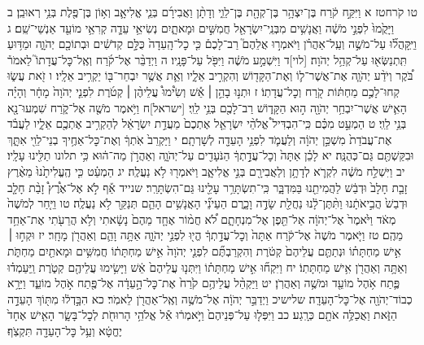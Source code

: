 \documentclass[twoside, openany, parskip=half, 11pt]{book}
\begin{document}
טו קֹרחטז א וַיִּקַּ֣ח קֹ֔רַח בֶּן־יִצְהָ֥ר בֶּן־קְהָ֖ת בֶּן־לֵוִ֑י וְדָתָ֨ן וַאֲבִירָ֜ם בְּנֵ֧י אֱלִיאָ֛ב וְא֥וֹן בֶּן־פֶּ֖לֶת בְּנֵ֥י רְאוּבֵֽן׃ ב וַיָּקֻ֙מוּ֙ לִפְנֵ֣י מֹשֶׁ֔ה וַאֲנָשִׁ֥ים מִבְּנֵֽי־יִשְׂרָאֵ֖ל חֲמִשִּׁ֣ים וּמָאתָ֑יִם נְשִׂיאֵ֥י עֵדָ֛ה קְרִאֵ֥י מוֹעֵ֖ד אַנְשֵׁי־שֵֽׁם׃ ג וַיִּֽקָּהֲל֞וּ עַל־מֹשֶׁ֣ה וְעַֽל־אַהֲרֹ֗ן וַיֹּאמְר֣וּ אֲלֵהֶם֮ רַב־לָכֶם֒ כִּ֤י כׇל־הָֽעֵדָה֙ כֻּלָּ֣ם קְדֹשִׁ֔ים וּבְתוֹכָ֖ם יְהֹוָ֑ה וּמַדּ֥וּעַ תִּֽתְנַשְּׂא֖וּ עַל־קְהַ֥ל יְהֹוָה׃ [לוי]ד וַיִּשְׁמַ֣ע מֹשֶׁ֔ה וַיִּפֹּ֖ל עַל־פָּנָֽיו׃ ה וַיְדַבֵּ֨ר אֶל־קֹ֜רַח וְאֶֽל־כׇּל־עֲדָתוֹ֮ לֵאמֹר֒ בֹּ֠קֶר וְיֹדַ֨ע יְהֹוָ֧ה אֶת־אֲשֶׁר־ל֛וֹ וְאֶת־הַקָּד֖וֹשׁ וְהִקְרִ֣יב אֵלָ֑יו וְאֵ֛ת אֲשֶׁ֥ר יִבְחַר־בּ֖וֹ יַקְרִ֥יב אֵלָֽיו׃ ו זֹ֖את עֲשׂ֑וּ קְחוּ־לָכֶ֣ם מַחְתּ֔וֹת קֹ֖רַח וְכׇל־עֲדָתֽוֹ׃ ז וּתְנ֣וּ בָהֵ֣ן ׀ אֵ֡שׁ וְשִׂ֩ימוּ֩ עֲלֵיהֶ֨ן ׀ קְטֹ֜רֶת לִפְנֵ֤י יְהֹוָה֙ מָחָ֔ר וְהָיָ֗ה הָאִ֛ישׁ אֲשֶׁר־יִבְחַ֥ר יְהֹוָ֖ה ה֣וּא הַקָּד֑וֹשׁ רַב־לָכֶ֖ם בְּנֵ֥י לֵוִֽי׃ [ישראל]ח וַיֹּ֥אמֶר מֹשֶׁ֖ה אֶל־קֹ֑רַח שִׁמְעוּ־נָ֖א בְּנֵ֥י לֵוִֽי׃ ט הַמְעַ֣ט מִכֶּ֗ם כִּֽי־הִבְדִּיל֩ אֱלֹהֵ֨י יִשְׂרָאֵ֤ל אֶתְכֶם֙ מֵעֲדַ֣ת יִשְׂרָאֵ֔ל לְהַקְרִ֥יב אֶתְכֶ֖ם אֵלָ֑יו לַעֲבֹ֗ד אֶת־עֲבֹדַת֙ מִשְׁכַּ֣ן יְהֹוָ֔ה וְלַעֲמֹ֛ד לִפְנֵ֥י הָעֵדָ֖ה לְשָׁרְתָֽם׃ י וַיַּקְרֵב֙ אֹֽתְךָ֔ וְאֶת־כׇּל־אַחֶ֥יךָ בְנֵי־לֵוִ֖י אִתָּ֑ךְ וּבִקַּשְׁתֶּ֖ם גַּם־כְּהֻנָּֽה׃ יא לָכֵ֗ן אַתָּה֙ וְכׇל־עֲדָ֣תְךָ֔ הַנֹּעָדִ֖ים עַל־יְהֹוָ֑ה וְאַהֲרֹ֣ן מַה־ה֔וּא כִּ֥י תלונו תַלִּ֖ינוּ עָלָֽיו׃ יב וַיִּשְׁלַ֣ח מֹשֶׁ֔ה לִקְרֹ֛א לְדָתָ֥ן וְלַאֲבִירָ֖ם בְּנֵ֣י אֱלִיאָ֑ב וַיֹּאמְר֖וּ לֹ֥א נַעֲלֶֽה׃ יג הַמְעַ֗ט כִּ֤י הֶֽעֱלִיתָ֙נוּ֙ מֵאֶ֨רֶץ זָבַ֤ת חָלָב֙ וּדְבַ֔שׁ לַהֲמִיתֵ֖נוּ בַּמִּדְבָּ֑ר כִּֽי־תִשְׂתָּרֵ֥ר עָלֵ֖ינוּ גַּם־הִשְׂתָּרֵֽר׃ שנייד אַ֡ף לֹ֣א אֶל־אֶ֩רֶץ֩ זָבַ֨ת חָלָ֤ב וּדְבַשׁ֙ הֲבִ֣יאֹתָ֔נוּ וַתִּ֨תֶּן־לָ֔נוּ נַחֲלַ֖ת שָׂדֶ֣ה וָכָ֑רֶם הַעֵינֵ֞י הָאֲנָשִׁ֥ים הָהֵ֛ם תְּנַקֵּ֖ר לֹ֥א נַעֲלֶֽה׃ טו וַיִּ֤חַר לְמֹשֶׁה֙ מְאֹ֔ד וַיֹּ֙אמֶר֙ אֶל־יְהֹוָ֔ה אַל־תֵּ֖פֶן אֶל־מִנְחָתָ֑ם לֹ֠א חֲמ֨וֹר אֶחָ֤ד מֵהֶם֙ נָשָׂ֔אתִי וְלֹ֥א הֲרֵעֹ֖תִי אֶת־אַחַ֥ד מֵהֶֽם׃ טז וַיֹּ֤אמֶר מֹשֶׁה֙ אֶל־קֹ֔רַח אַתָּה֙ וְכׇל־עֲדָ֣תְךָ֔ הֱי֖וּ לִפְנֵ֣י יְהֹוָ֑ה אַתָּ֥ה וָהֵ֛ם וְאַהֲרֹ֖ן מָחָֽר׃ יז וּקְח֣וּ ׀ אִ֣ישׁ מַחְתָּת֗וֹ וּנְתַתֶּ֤ם עֲלֵיהֶם֙ קְטֹ֔רֶת וְהִקְרַבְתֶּ֞ם לִפְנֵ֤י יְהֹוָה֙ אִ֣ישׁ מַחְתָּת֔וֹ חֲמִשִּׁ֥ים וּמָאתַ֖יִם מַחְתֹּ֑ת וְאַתָּ֥ה וְאַהֲרֹ֖ן אִ֥ישׁ מַחְתָּתֽוֹ׃ יח וַיִּקְח֞וּ אִ֣ישׁ מַחְתָּת֗וֹ וַיִּתְּנ֤וּ עֲלֵיהֶם֙ אֵ֔שׁ וַיָּשִׂ֥ימוּ עֲלֵיהֶ֖ם קְטֹ֑רֶת וַֽיַּעַמְד֗וּ פֶּ֛תַח אֹ֥הֶל מוֹעֵ֖ד וּמֹשֶׁ֥ה וְאַהֲרֹֽן׃ יט וַיַּקְהֵ֨ל עֲלֵיהֶ֥ם קֹ֙רַח֙ אֶת־כׇּל־הָ֣עֵדָ֔ה אֶל־פֶּ֖תַח אֹ֣הֶל מוֹעֵ֑ד וַיֵּרָ֥א כְבוֹד־יְהֹוָ֖ה אֶל־כׇּל־הָעֵדָֽה׃
שלישיכ וַיְדַבֵּ֣ר יְהֹוָ֔ה אֶל־מֹשֶׁ֥ה וְאֶֽל־אַהֲרֹ֖ן לֵאמֹֽר׃ כא הִבָּ֣דְל֔וּ מִתּ֖וֹךְ הָעֵדָ֣ה הַזֹּ֑את וַאֲכַלֶּ֥ה אֹתָ֖ם כְּרָֽגַע׃ כב וַיִּפְּל֤וּ עַל־פְּנֵיהֶם֙ וַיֹּ֣אמְר֔וּ אֵ֕ל אֱלֹהֵ֥י הָרוּחֹ֖ת לְכׇל־בָּשָׂ֑ר הָאִ֤ישׁ אֶחָד֙ יֶחֱטָ֔א וְעַ֥ל כׇּל־הָעֵדָ֖ה תִּקְצֹֽף׃
\end{document}
